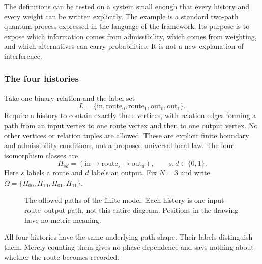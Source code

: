 The definitions can be tested on a system small enough that every history
and every weight can be written explicitly. The example is a standard
two-path quantum process expressed in the language of the framework.
Its purpose is to expose which information comes from admissibility, which
comes from weighting, and which alternatives can carry probabilities.
It is not a new explanation of interference.

\subsubsection{The four histories}

Take one binary relation and the label set
\[
  L=\{\mathrm{in},\mathrm{route}_0,\mathrm{route}_1,
       \mathrm{out}_0,\mathrm{out}_1\}.
\]
Require a history to contain exactly three vertices, with relation edges
forming a path from an input vertex to one route vertex and then to one
output vertex. No other vertices or relation tuples are allowed. These
are explicit finite boundary and admissibility conditions, not a proposed
universal local law. The four isomorphism classes are
\[
  H_{sd}=(\mathrm{in}\longrightarrow\mathrm{route}_s
                  \longrightarrow\mathrm{out}_d),
  \qquad s,d\in\{0,1\}.
\]
Here $s$ labels a route and $d$ labels an output. Fix $N=3$ and write
$\Omega=\{H_{00},H_{10},H_{01},H_{11}\}$.

\begin{figure}[ht]
  \centering
  \caption{The allowed paths of the finite model. Each history is one
  input--route--output path, not this entire diagram. Positions in the
  drawing have no metric meaning.}
  \label{fig:twopath}
\end{figure}

All four histories have the same underlying path shape. Their labels
distinguish them. Merely counting them gives no phase dependence and says
nothing about whether the route becomes recorded.

